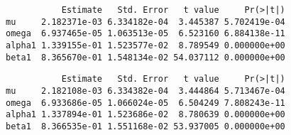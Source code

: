 \documentclass[
  ignorenonframetext,
]{beamer}
\newenvironment{Shaded}{\begin{snugshade}}{\end{snugshade}}
\newcommand{\AttributeTok}[1]{\textcolor[rgb]{0.77,0.63,0.00}{#1}}
\newcommand{\CommentTok}[1]{\textcolor[rgb]{0.56,0.35,0.01}{\textit{#1}}}
\newcommand{\DecValTok}[1]{\textcolor[rgb]{0.00,0.00,0.81}{#1}}
\newcommand{\FunctionTok}[1]{\textcolor[rgb]{0.00,0.00,0.00}{#1}}
\newcommand{\NormalTok}[1]{#1}
\newcommand{\OtherTok}[1]{\textcolor[rgb]{0.56,0.35,0.01}{#1}}
\newcommand{\SpecialCharTok}[1]{\textcolor[rgb]{0.00,0.00,0.00}{#1}}
\newenvironment{Shaded}{\begin{snugshade}}{\end{snugshade}}
\newcommand{\AttributeTok}[1]{\textcolor[rgb]{0.77,0.63,0.00}{#1}}
\newcommand{\CommentTok}[1]{\textcolor[rgb]{0.56,0.35,0.01}{\textit{#1}}}
\newcommand{\DecValTok}[1]{\textcolor[rgb]{0.00,0.00,0.81}{#1}}
\newcommand{\FunctionTok}[1]{\textcolor[rgb]{0.00,0.00,0.00}{#1}}
\newcommand{\NormalTok}[1]{#1}
\newcommand{\OtherTok}[1]{\textcolor[rgb]{0.56,0.35,0.01}{#1}}
\newcommand{\SpecialCharTok}[1]{\textcolor[rgb]{0.00,0.00,0.00}{#1}}
\begin{document}
\begin{frame}[fragile]
\begin{Shaded}
\end{Shaded}
\begin{verbatim}
           Estimate   Std. Error   t value     Pr(>|t|)
mu     2.182371e-03 6.334182e-04  3.445387 5.702419e-04
omega  6.937465e-05 1.063513e-05  6.523160 6.884138e-11
alpha1 1.339155e-01 1.523577e-02  8.789549 0.000000e+00
beta1  8.365670e-01 1.548134e-02 54.037112 0.000000e+00
\end{verbatim}
\begin{Shaded}
\end{Shaded}
\begin{verbatim}
           Estimate   Std. Error   t value     Pr(>|t|)
mu     2.182108e-03 6.334382e-04  3.444864 5.713467e-04
omega  6.933686e-05 1.066024e-05  6.504249 7.808243e-11
alpha1 1.337894e-01 1.523686e-02  8.780639 0.000000e+00
beta1  8.366535e-01 1.551168e-02 53.937005 0.000000e+00
\end{verbatim}
\end{frame}
\end{document}
